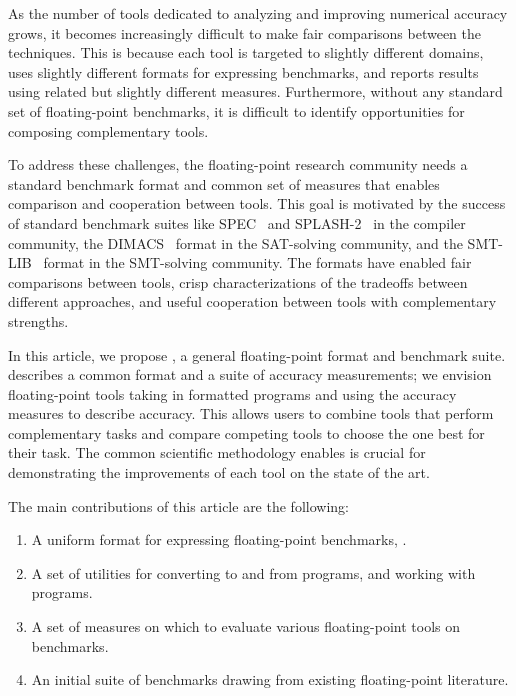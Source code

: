 \documentclass[main.tex]{subfiles}
\begin{document}
As the number of tools dedicated to analyzing and improving numerical
accuracy grows, it becomes increasingly difficult to make fair
comparisons between the techniques.  This is because each tool is targeted
to slightly different domains, uses slightly different formats for
expressing benchmarks, and reports results using related but slightly
different measures.  Furthermore, without any standard set of floating-point
benchmarks, it is difficult to identify opportunities for composing
complementary tools.

To address these challenges, the floating-point research community needs a
standard benchmark format and common set of measures that enables
comparison and cooperation between tools.  This goal is motivated by the
success of standard benchmark suites like SPEC~\cite{spec} and
SPLASH-2~\cite{splash} in
the compiler community, the DIMACS~\cite{dimacs} format in the SAT-solving
community, and the SMT-LIB~\cite{smtlib} format in the SMT-solving community.
The formats have enabled fair comparisons between tools, crisp
characterizations of the tradeoffs between different approaches, and useful
cooperation between tools with complementary strengths.

In this article, we propose \name,
  a general floating-point format and benchmark suite.
\name describes a common format
  and a suite of accuracy measurements;
  we envision floating-point tools taking in \name formatted programs
  and using the \name accuracy measures to describe accuracy.
This allows users to combine tools that perform complementary tasks
  and compare competing tools to choose the one best for their task.
The common scientific methodology \name enables
  is crucial for demonstrating the
  improvements of each tool on the state of the art.

The main contributions of this article are the following:
\begin{enumerate}[label=(\roman*)]
%
\item A uniform format for expressing floating-point benchmarks, \core.
%
\item A set of utilities for converting to and from \core programs, and
  working with \core programs.
%
\item A set of measures on which to evaluate various floating-point tools
  on \name benchmarks.
%
\item An initial suite of benchmarks drawing from existing floating-point
  literature.
%
\end{enumerate}
\end{document}
